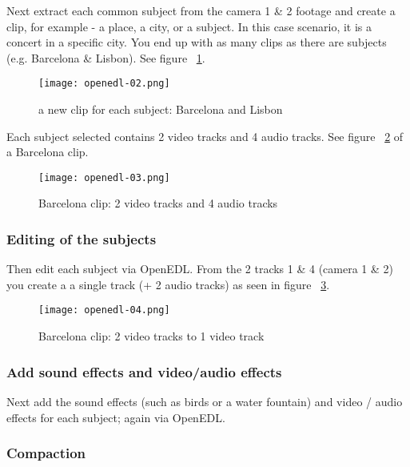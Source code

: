 Next extract each common subject from the camera 1 \& 2 footage and create a clip, for example - a place, a city, or a subject. In this case scenario, it is a concert in a specific city.
You end up with as many clips as there are subjects (e.g. Barcelona \& Lisbon).
 See figure ~\ref{fig:openedl-02}.

\begin{figure}[htpb]
	\centering
	\texttt{[image: openedl-02.png]}
	\caption{a new clip for each subject: Barcelona and Lisbon}
	\label{fig:openedl-02}
\end{figure}

Each subject selected contains 2 video tracks and 4 audio tracks. See figure ~\ref{fig:openedl-03} of a Barcelona clip.

\begin{figure}[htpb]
	\centering
	\texttt{[image: openedl-03.png]}
	\caption{Barcelona clip: 2 video tracks and 4 audio tracks}
	\label{fig:openedl-03}
\end{figure}

\subsubsection*{Editing of the subjects}
\label{ssub:editing_subjects}

Then edit each subject via OpenEDL. From the 2 tracks 1 \& 4 (camera 1 \& 2) you create a a single track (+ 2 audio tracks) as seen in figure ~\ref{fig:openedl-04}.

\begin{figure}[htpb]
	\centering
	\texttt{[image: openedl-04.png]}
	\caption{Barcelona clip: 2 video tracks to 1 video track}
	\label{fig:openedl-04}
\end{figure}

\subsubsection*{Add sound effects and video/audio effects}
\label{ssub:add_sound_video_effects}

Next add the sound effects (such as birds or a water fountain) and video / audio effects for each subject; again via OpenEDL.

\subsubsection*{Compaction}
\label{ssub:compaction}

